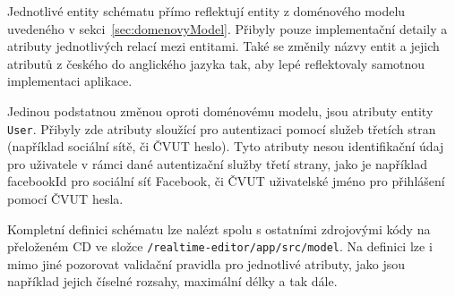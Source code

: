 Jednotlivé entity schématu přímo reflektují entity z doménového modelu uvedeného v sekci~\ref{sec:domenovyModel}.
Přibyly pouze implementační detaily a atributy jednotlivých relací mezi entitami.
Také se změnily názvy entit a jejich atributů z českého do anglického jazyka tak, aby lepé reflektovaly samotnou implementaci aplikace.

Jedinou podstatnou změnou oproti doménovému modelu, jsou atributy entity \texttt{User}.
Přibyly zde atributy sloužící pro autentizaci pomocí služeb třetích stran (například sociální sítě, či \acrshort{ČVUT} heslo).
Tyto atributy nesou identifikační údaj pro uživatele v rámci dané autentizační služby třetí strany, jako je například facebookId pro sociální síť Facebook, či \acrshort{ČVUT} uživatelské jméno pro přihlášení pomocí \acrshort{ČVUT} hesla.

Kompletní definici schématu lze nalézt spolu s ostatními zdrojovými kódy na přeloženém CD ve složce \texttt{/realtime-editor/app/src/model}.
Na definici lze i mimo jiné pozorovat validační pravidla pro jednotlivé atributy, jako jsou například jejich číselné rozsahy, maximální délky a tak dále.
